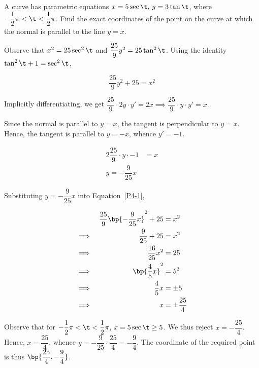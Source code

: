 \documentclass{echw}
\begin{document}

    \problem{}
        A curve has parametric equations $x = 5\sec\t, \, y = 3\tan\t$, where $-\dfrac12\pi < \t < \dfrac12\pi$. Find the exact coordinates of the point on the curve at which the normal is parallel to the line $y=x$.

    \solution
        Observe that $x^2 = 25\sec^2\t$ and $\dfrac{25}9 y^2 = 25\tan^2\t$. Using the identity $\tan^2\t + 1 = \sec^2\t$,

        \begin{equation}\label{P4-1}
            \dfrac{25}9 y^2 + 25 = x^2
        \end{equation}

        Implicitly differentiating, we get $\dfrac{25}9 \cdot 2y \cdot y' = 2x \implies \dfrac{25}9 \cdot y \cdot y' = x$.

        Since the normal is parallel to $y =x$, the tangent is perpendicular to $y=x$. Hence, the tangent is parallel to $y = -x$, whence $y' = -1$.

        \begin{alignat*}{2}
            \dfrac{25}9 \cdot y \cdot -1 &= x\\
            y = -\dfrac{9}{25} x
        \end{alignat*}

        Substituting $y = -\dfrac9{25}x$ into Equation~\ref{P4-1},

        \begin{alignat*}{2}
            &&\dfrac{25}9 \bp{-\dfrac9{25}x}^2+25 &= x^2\\
            \implies&&\dfrac{9}{25} + 25 &= x^2\\
            \implies&&\dfrac{16}{25}x^2 &= 25\\
            \implies&&\bp{\dfrac45 x}^2 &= 5^2\\
            \implies&&\dfrac45 x &= \pm 5\\
            \implies&& x &= \pm \dfrac{25}4
        \end{alignat*}

        Observe that for $-\dfrac12\pi < \t < \dfrac12\pi$, $x=5\sec\t \geq 5$. We thus reject $x = -\dfrac{25}4$. Hence, $x=\dfrac{25}4$, whence $y = -\dfrac{9}{25} \cdot \dfrac{25}4 = -\dfrac{9}4$. The coordinate of the required point is thus $\bp{\dfrac{25}4, -\dfrac94}$.
        
\end{document}
